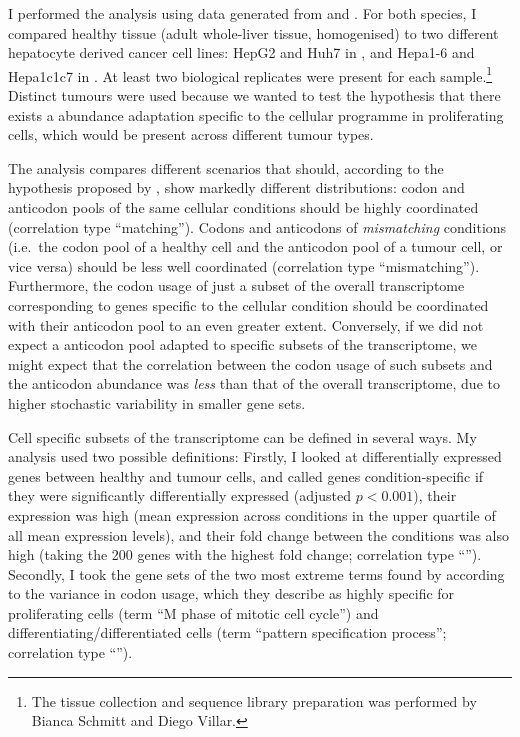 I performed the analysis using data generated from \mmu and \hsa. For both
species, I compared healthy tissue (adult whole-liver tissue, homogenised) to
two different hepatocyte derived cancer cell lines: HepG2 and Huh7 in \hsa, and
Hepa1-6 and Hepa1c1c7 in \mmu. At least two biological replicates were present
for each sample.\footnote{The tissue collection and sequence library preparation
was performed by Bianca Schmitt and Diego Villar.} Distinct tumours were used
because we wanted to test the hypothesis that there exists a \trna abundance
adaptation specific to the cellular programme in proliferating cells, which
would be present across different tumour types.

The analysis compares different scenarios that should, according to the
hypothesis proposed by \citet{Gingold:2014}, show markedly different
distributions: codon and anticodon pools of the same cellular conditions should
be highly coordinated (correlation type “matching”). Codons and anticodons of
\emph{mismatching} conditions (i.e.\ the codon pool of a healthy cell and the
anticodon pool of a tumour cell, or vice versa) should be less well coordinated
(correlation type “mismatching”). Furthermore, the codon usage of just a subset
of the overall transcriptome corresponding to genes specific to the cellular
condition should be coordinated with their anticodon pool to an even greater
extent. Conversely, if we did not expect a \trna anticodon pool adapted to
specific subsets of the transcriptome, we might expect that the correlation
between the codon usage of such subsets and the anticodon abundance was
\emph{less} than that of the overall transcriptome, due to higher stochastic
variability in smaller gene sets.

Cell specific subsets of the transcriptome can be defined in several ways. My
analysis used two possible definitions: Firstly, I looked at differentially
expressed genes between healthy and tumour cells, and called genes
condition-specific if they were significantly differentially expressed (adjusted
\(p < 0.001\)), their expression was high (mean expression across conditions in
the upper quartile of all mean expression levels), and their fold change between
the conditions was also high (taking the \num{200} genes with the highest fold
change; correlation type “”). Secondly, I took the gene sets of the two
most extreme \go terms found by \citet{Gingold:2014} according to the variance
in codon usage, which they describe as highly specific for proliferating cells
(\go term “M phase of mitotic cell cycle”) and differentiating/differentiated
cells (\go term “pattern specification process”; correlation type “”).

